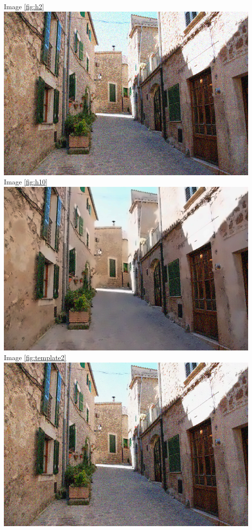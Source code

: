 \documentclass[11pt]{article}
\begin{document}


\newpage
\begin{appendices}
Image \ref{fig:h2}\\
\includegraphics[width=0.8\linewidth]{h2}\\
Image \ref{fig:h10}\\
\includegraphics[width=0.8\linewidth]{h10}
\newpage
Image \ref{fig:template2}\\
\includegraphics[width=0.8\linewidth]{template2}\\

\end{appendices}
\end{document}
